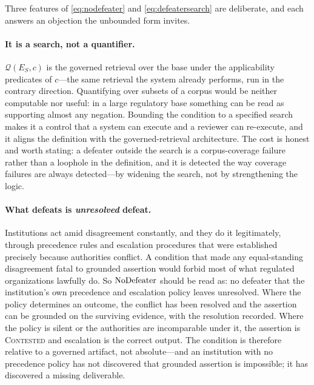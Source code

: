 Three features of \eqref{eq:nodefeater} and \eqref{eq:defeatersearch} are deliberate,
and each answers an objection the unbounded form invites.

\paragraph{It is a search, not a quantifier.} $\mathcal{Q}(E_S, c)$ is the governed
retrieval over the base under the applicability predicates of $c$---the same retrieval
the system already performs, run in the contrary direction. Quantifying over subsets of
a corpus would be neither computable nor useful: in a large regulatory base something
can be read as supporting almost any negation. Bounding the condition to a specified
search makes it a control that a system can execute and a reviewer can re-execute, and
it aligns the definition with the governed-retrieval
architecture. The cost is honest and worth stating: a defeater outside
the search is a corpus-coverage failure rather than a loophole in the definition, and it
is detected the way coverage failures are always detected---by widening the search, not
by strengthening the logic.

\paragraph{What defeats is \emph{unresolved} defeat.} Institutions act amid
disagreement constantly, and they do it legitimately, through precedence rules and
escalation procedures that were established precisely because authorities conflict. A
condition that made any equal-standing disagreement fatal to grounded assertion would
forbid most of what regulated organizations lawfully do. So $\operatorname{NoDefeater}$ should be read
as: no defeater that the institution's own precedence and escalation policy leaves
unresolved. Where the policy determines an outcome, the conflict has been resolved and
the assertion can be grounded on the surviving evidence, with the resolution recorded.
Where the policy is silent or the authorities are incomparable under it, the assertion is
\textsc{Contested} and escalation is the correct output. The condition is therefore
relative to a governed artifact, not absolute---and an institution with no precedence
policy has not discovered that grounded assertion is impossible; it has discovered a
missing deliverable.

